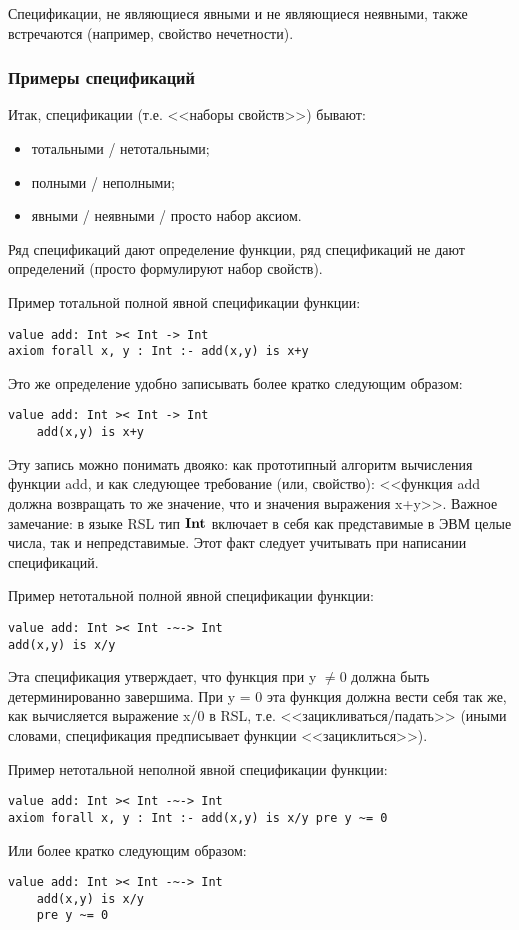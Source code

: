 \documentclass[14pt, twoside]{extreport}
\newcommand{\head}[1]{\vspace{1cm}\subsubsection*{#1}}
\begin{document}
Спецификации, не являющиеся явными и не являющиеся неявными, также встречаются (например, свойство нечетности).

\head{Примеры спецификаций}

Итак, спецификации (т.е. <<наборы свойств>>) бывают:
\begin{itemize}
  \item тотальными / нетотальными;
  \item полными / неполными;
  \item явными / неявными / просто набор аксиом.
\end{itemize}

Ряд спецификаций дают определение функции, ряд спецификаций не дают определений (просто формулируют набор свойств).

Пример тотальной полной явной спецификации функции:
\begin{lstlisting}
value add: Int >< Int -> Int
axiom forall x, y : Int :- add(x,y) is x+y
\end{lstlisting}

Это же определение удобно записывать более кратко следующим образом:
\begin{lstlisting}
value add: Int >< Int -> Int
    add(x,y) is x+y
\end{lstlisting}
Эту запись можно понимать двояко: как прототипный алгоритм вычисления функции add, и как следующее требование (или, свойство): <<функция add должна возвращать то же значение, что и значения выражения x+y>>. Важное замечание: в языке RSL тип $\textbf{Int}$ включает в себя как представимые в ЭВМ целые числа, так и непредставимые. Этот факт следует учитывать при написании спецификаций.

Пример нетотальной полной явной спецификации функции:
\begin{lstlisting}
value add: Int >< Int -~-> Int
add(x,y) is x/y
\end{lstlisting}
Эта спецификация утверждает, что функция при y $\neq 0$ должна быть детерминированно завершима. При y = 0 эта функция должна вести себя так же, как вычисляется выражение x$/0$ в RSL, т.е. <<зацикливаться/падать>> (иными словами, спецификация предписывает функции <<зациклиться>>).

Пример нетотальной неполной явной спецификации функции:
\begin{lstlisting}
value add: Int >< Int -~-> Int
axiom forall x, y : Int :- add(x,y) is x/y pre y ~= 0
\end{lstlisting}
Или более кратко следующим образом:
\begin{lstlisting}
value add: Int >< Int -~-> Int
    add(x,y) is x/y
    pre y ~= 0
\end{lstlisting}
\end{document}
